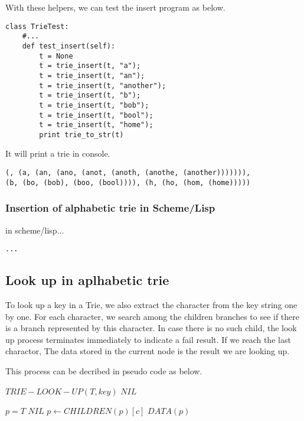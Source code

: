 \documentclass{article}
\begin{document}
With these helpers, we can test the insert program as below.

\begin{lstlisting}
class TrieTest:
    #...
    def test_insert(self):
        t = None
        t = trie_insert(t, "a");
        t = trie_insert(t, "an");
        t = trie_insert(t, "another");
        t = trie_insert(t, "b");
        t = trie_insert(t, "bob");
        t = trie_insert(t, "bool");
        t = trie_insert(t, "home");
        print trie_to_str(t)
\end{lstlisting}

It will print a trie in console.

\begin{verbatim}
(, (a, (an, (ano, (anot, (anoth, (anothe, (another))))))), 
(b, (bo, (bob), (boo, (bool)))), (h, (ho, (hom, (home)))))
\end{verbatim}

\subsubsection*{Insertion of alphabetic trie in Scheme/Lisp}
in scheme/lisp...

\lstset{language=lisp}
\begin{lstlisting}
...
\end{lstlisting}

\subsection{Look up in aplhabetic trie}
To look up a key in a Trie, we also extract the character from the
key string one by one. For each character, we search among the children
branches to see if there is a branch represented by this character.
In case there is no such child, the look up process terminates 
immediately to indicate a fail result. If we reach the last charactor,
The data stored in the current node is the result we are looking up.

This process can be decribed in pseudo code as below.

\begin{algorithmic}
\STATE $TRIE-LOOK-UP(T, key)$
   \RETURN $NIL$ \ENDIF

  \STATE $p=T$
      \RETURN $NIL$
    \ENDIF
    \STATE $p \leftarrow CHILDREN(p)[c]$
  \ENDFOR
  \RETURN $DATA(p)$
\end{algorithmic}
\end{document}
